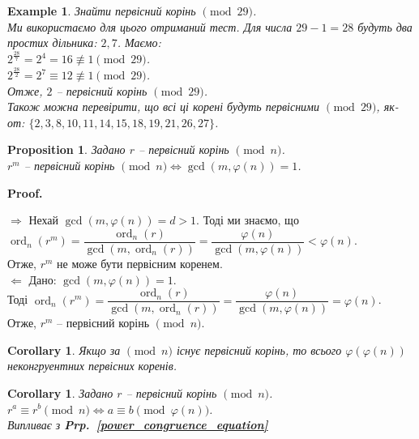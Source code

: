 \documentclass[a4paper, 14pt]{extarticle}
\makeatletter
\theoremstyle{theoremdd}
\theoremstyle{theoremdd}
\theoremstyle{theoremdd}
\theoremstyle{theoremdd}
\newtheorem{example}[theorem]{Example}
\theoremstyle{theoremdd}
\newtheorem{proposition}[theorem]{Proposition}
\theoremstyle{theoremdd}
\theoremstyle{theoremdd}
\theoremstyle{theoremdd}
\newtheorem{corollary}[theorem]{Corollary}
\def\qed{$\blacksquare$}
\def\rightproof{$\boxed{\Rightarrow}$ }
\def\leftproof{$\boxed{\Leftarrow}$ }
\renewenvironment{proof}[1][Proof.\\]{\par
\pushQED{\hfill \qed}%
\normalfont \topsep6\p@\@plus6\p@\relax
\trivlist
\item\relax
{\bfseries
#1\@addpunct{.}}\hspace\labelsep\ignorespaces
}{%
\popQED\endtrivlist\@endpefalse
}
\DeclareMathOperator{\ord}{ord}
\newcommand\prpref[1]{\textbf{Prp.~\ref{#1}}}
\makeatother
\begin{document}
\begin{example}
Знайти первісний корінь $\!\! \pmod {29}$.\\
Ми використаємо для цього отриманий тест. Для числа $29-1=28$ будуть два простих дільника: $2,7$. Маємо:\\
$2^{\frac{28}{7}} = 2^4 = 16 \not\equiv 1 \pmod {29}$.\\
$2^{\frac{28}{2}} = 2^7 \equiv 12 \not\equiv 1 \pmod {29}$.\\
Отже, $2$ -- первісний корінь $\pmod {29}$.\\
Також можна перевірити, що всі ці корені будуть первісними $\pmod {29}$, як-от: $\{2,3,8,10,11,14,15,18,19,21,26,27\}$.
\end{example}

\begin{proposition}
Задано $r$ -- первісний корінь $\!\! \pmod n$.\\
$r^m$ -- первісний корінь $\pmod n \iff \gcd(m,\varphi(n)) = 1$.
\end{proposition}

\begin{proof}
\rightproof Нехай $\gcd(m,\varphi(n)) = d > 1$. Тоді ми знаємо, що\\
$\ord_n (r^m) = \dfrac{\ord_n (r)}{\gcd(m,\ord_n (r))} = \dfrac{\varphi(n)}{\gcd(m,\varphi(n))} < \varphi(n)$.\\
Отже, $r^m$ не може бути первісним коренем.
\bigskip \\
\leftproof Дано: $\gcd(m,\varphi(n)) = 1$.\\
Тоді $\ord_{n} (r^m) = \dfrac{\ord_n (r)}{\gcd(m,\ord_n (r))} = \dfrac{\varphi(n)}{\gcd(m,\varphi(n))} = \varphi(n)$.\\
Отже, $r^m$ -- первісний корінь $\pmod n$.
\end{proof}

\begin{corollary}
Якщо за $\!\! \pmod n$ існує первісний корінь, то всього $\varphi(\varphi(n))$ неконгруентних первісних коренів.
\end{corollary}

\begin{corollary}
Задано $r$ -- первісний корінь $\pmod n$.\\
$r^a \equiv r^b \pmod n \iff a \equiv b \pmod {\varphi(n)}$.\\
\textit{Випливає з} \prpref{power_congruence_equation}
\end{corollary}
\end{document}
